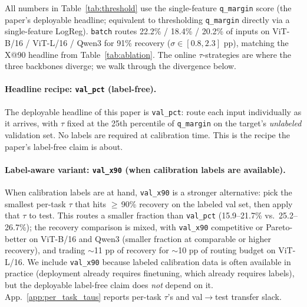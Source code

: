 \documentclass{article}
\begin{document}


All numbers in Table~\ref{tab:threshold} use the single-feature \texttt{q\_margin} score (the paper's deployable headline; equivalent to thresholding \texttt{q\_margin} directly via a single-feature LogReg). \texttt{batch} routes 22.2\% / 18.4\% / 20.2\% of inputs on ViT-B/16 / ViT-L/16 / Qwen3 for 91\% recovery ($\sigma \in [0.8, 2.3]$ pp), matching the X@90 headline from Table~\ref{tab:ablation}. The online $\tau$-strategies are where the three backbones diverge; we walk through the divergence below.

\paragraph{Headline recipe: \texttt{val\_pct} (label-free).}
The deployable headline of this paper is \texttt{val\_pct}: route each input individually as it arrives, with $\tau$ fixed at the 25th percentile of \texttt{q\_margin} on the target's \emph{unlabeled} validation set. No labels are required at calibration time. This is the recipe the paper's label-free claim is about.

\paragraph{Label-aware variant: \texttt{val\_x90} (when calibration labels are available).}
When calibration labels are at hand, \texttt{val\_x90} is a stronger alternative: pick the smallest per-task $\tau$ that hits $\geq$\,90\% recovery on the labeled val set, then apply that $\tau$ to test. This routes a smaller fraction than \texttt{val\_pct} (15.9--21.7\% vs.\ 25.2--26.7\%); the recovery comparison is mixed, with \texttt{val\_x90} competitive or Pareto-better on ViT-B/16 and Qwen3 (smaller fraction at comparable or higher recovery), and trading $\sim$11 pp of recovery for $\sim$10 pp of routing budget on ViT-L/16. We include \texttt{val\_x90} because labeled calibration data is often available in practice (deployment already requires finetuning, which already requires labels), but the deployable label-free claim does \emph{not} depend on it. App.~\ref{app:per_task_taus} reports per-task $\tau$'s and val$\to$test transfer slack.
\end{document}
